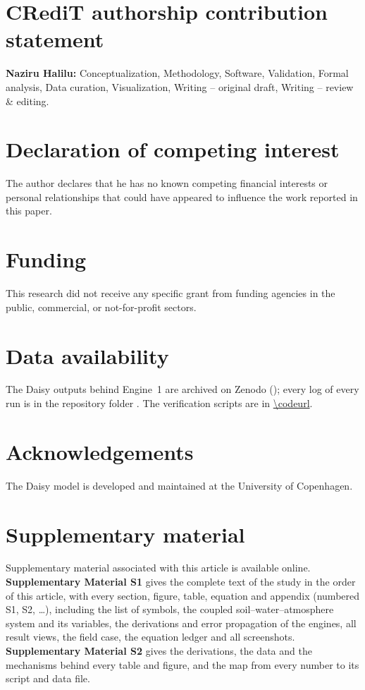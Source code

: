 \documentclass[preprint,12pt]{elsarticle}
\begin{document}
\section*{CRediT authorship contribution statement}
\textbf{Naziru Halilu:} Conceptualization, Methodology, Software, Validation, Formal analysis, Data curation, Visualization, Writing -- original draft, Writing -- review \& editing.

\section*{Declaration of competing interest}
The author declares that he has no known competing financial interests or personal relationships that could have appeared to influence the work reported in this paper.

\section*{Funding}
This research did not receive any specific grant from funding agencies in the public, commercial, or not-for-profit sectors.

\section*{Data availability}
The Daisy outputs behind Engine~1 are archived on Zenodo (); every log of every run is in the repository folder \cslink{}. The verification scripts are in \url{\codeurl}.

\section*{Acknowledgements}
The Daisy model is developed and maintained at the University of Copenhagen.

\section*{Supplementary material}
Supplementary material associated with this article is available online. \textbf{Supplementary Material S1} gives the complete text of the study in the order of this article, with every section, figure, table, equation and appendix (numbered S1, S2, \ldots), including the list of symbols, the coupled soil--water--atmosphere system and its variables, the derivations and error propagation of the engines, all result views, the field case, the equation ledger and all screenshots. \textbf{Supplementary Material S2} gives the derivations, the data and the mechanisms behind every table and figure, and the map from every number to its script and data file.



\end{document}
